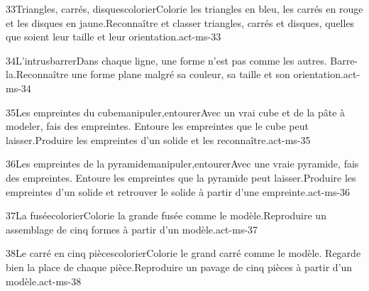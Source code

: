 \begin{activite}{33}{Triangles, carrés, disques}{colorier}{Colorie les triangles en {\otBold\color{otNavy}bleu}, les carrés en {\otBold\color{otNavy}rouge} et les disques en {\otBold\color{otNavy}jaune}.}{Reconnaître et classer triangles, carrés et disques, quelles que soient leur taille et leur orientation.}{act-ms-33}
\end{activite}
\begin{activite}{34}{L’intrus}{barrer}{Dans chaque ligne, une forme n’est pas comme les autres. {\otBold\color{otNavy}Barre-la}.}{Reconnaître une forme plane malgré sa couleur, sa taille et son orientation.}{act-ms-34}
\end{activite}
\begin{activite}{35}{Les empreintes du cube}{manipuler,entourer}{Avec un vrai cube et de la pâte à modeler, fais des empreintes. {\otBold\color{otNavy}Entoure} les empreintes que le cube peut laisser.}{Produire les empreintes d’un solide et les reconnaître.}{act-ms-35}
\end{activite}
\begin{activite}{36}{Les empreintes de la pyramide}{manipuler,entourer}{Avec une vraie pyramide, fais des empreintes. {\otBold\color{otNavy}Entoure} les empreintes que la pyramide peut laisser.}{Produire les empreintes d’un solide et retrouver le solide à partir d’une empreinte.}{act-ms-36}
\end{activite}
\begin{activite}{37}{La fusée}{colorier}{Colorie la grande fusée comme le {\otBold\color{otNavy}modèle}.}{Reproduire un assemblage de cinq formes à partir d’un modèle.}{act-ms-37}
\end{activite}
\begin{activite}{38}{Le carré en cinq pièces}{colorier}{Colorie le grand carré comme le {\otBold\color{otNavy}modèle}. Regarde bien la place de chaque pièce.}{Reproduire un pavage de cinq pièces à partir d’un modèle.}{act-ms-38}
\end{activite}

